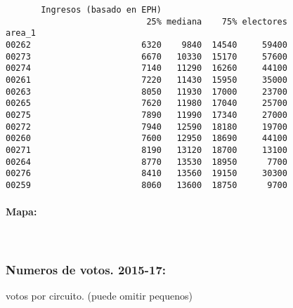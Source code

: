 \documentclass[11pt]{article}
\begin{document}
    \begin{verbatim}
       Ingresos (basado en EPH)                         
                            25% mediana    75% electores
area_1                                                  
00262                      6320    9840  14540     59400
00273                      6670   10330  15170     57600
00274                      7140   11290  16260     44100
00261                      7220   11430  15950     35000
00263                      8050   11930  17000     23700
00265                      7620   11980  17040     25700
00275                      7890   11990  17340     27000
00272                      7940   12590  18180     19700
00260                      7600   12950  18690     44100
00271                      8190   13120  18700     13100
00264                      8770   13530  18950      7700
00276                      8410   13560  19150     30300
00259                      8060   13600  18750      9700
    \end{verbatim}

    
    \hypertarget{mapa}{%
\paragraph{Mapa:}\label{mapa}}

    
    \begin{center}
    \end{center}
    { \hspace*{\fill} \\}
    
    \hypertarget{numeros-de-votos.-2015-17}{%
\subsubsection{Numeros de votos.
2015-17:}\label{numeros-de-votos.-2015-17}}

    
    votos por circuito. (puede omitir pequenos)

    
    
\end{document}
